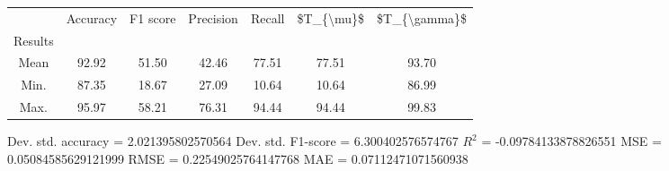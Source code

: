 \begin{tabular}{|c|c|c|c|c|c|c|}
\toprule
{} &  Accuracy &  F1 score &  Precision &  Recall &  \$T\_\{\textbackslash mu\}\$ &  \$T\_\{\textbackslash gamma\}\$ \\
Results &           &           &            &         &            &               \\
\hline
Mean    &     92.92 &     51.50 &      42.46 &   77.51 &      77.51 &         93.70 \\
Min.    &     87.35 &     18.67 &      27.09 &   10.64 &      10.64 &         86.99 \\
Max.    &     95.97 &     58.21 &      76.31 &   94.44 &      94.44 &         99.83 \\
\bottomrule
\end{tabular}

 Dev. std. accuracy = 2.021395802570564
 Dev. std. F1-score = 6.300402576574767
 $R^2$ = -0.09784133878826551
 MSE = 0.05084585629121999
 RMSE = 0.22549025764147768
 MAE = 0.07112471071560938